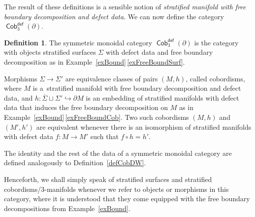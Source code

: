 \documentclass[10pt,a4paper]{amsart}
\DeclareMathOperator{\Cob}{\mathsf{Cob}}
\numberwithin{equation}{section}
\theoremstyle{definition}
\newtheorem{Definition}[Definition]{Definition}
\begin{document}
The result of these definitions is a sensible notion of \textit{stratified manifold with free boundary decomposition and defect data}. We can now define the category $\Cob_3^{\mathsf{def}}(\partial)$.
\begin{Definition}
 The symmetric monoidal category $\Cob_3^{\mathsf{def}}(\partial)$ is the category with objects stratified surfaces $\Sigma$ with defect data and free boundary decomposition as in Example~\ref{exBound}\,\ref{exFreeBoundSurf}.

 Morphisms $\Sigma \rightarrow \Sigma'$ are equivalence classes of pairs $(M, h)$, called cobordisms, where $M$ is a~stratified manifold with free boundary decomposition and defect data, and $h\colon \overline{\Sigma} \sqcup \Sigma' \hookrightarrow \partial M$ is an embedding of stratified manifolds with defect data that induces the free boundary decomposition on $M$ as in Example~\ref{exBound}\,\ref{exFreeBoundCob}. Two such cobordisms $(M, h)$ and $(M', h')$ are equivalent whenever there is an isomorphism of stratified manifolds with defect data $f\colon M \rightarrow M'$ such that $f \circ h = h'$.

 The identity and the rest of the data of a symmetric monoidal category are defined analogously to Definition~\ref{defCobDW}.
\end{Definition}

Henceforth, we shall simply speak of stratified surfaces and stratified cobordisms/3-manifolds whenever we refer to objects or morphisms in this category, where it is understood that they come equipped with the free boundary decompositions from Example~\ref{exBound}.
\end{document}
